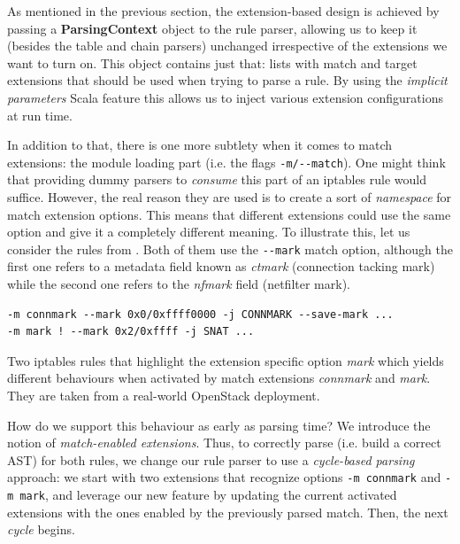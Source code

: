 As mentioned in the previous section, the extension-based design is achieved by
passing a \textbf{ParsingContext} object to the rule parser, allowing us to
keep it (besides the table and chain parsers) unchanged irrespective of the
extensions we want to turn on.  This object contains just that: lists with
match and target extensions that should be used when trying to parse a rule.
By using the \emph{implicit parameters} Scala feature this allows us to inject
various extension configurations at run time.

In addition to that, there is one more subtlety when it comes to match
extensions: the module loading part (i.e. the flags \lstinline{-m/--match}).
One might think that providing dummy parsers to \emph{consume} this part of an
iptables rule would suffice.  However, the real reason they are used is to
create a sort of \emph{namespace} for match extension options.  This means that
different extensions could use the same option and give it a completely
different meaning.  To illustrate this, let us consider the rules from
.  Both of them use the
\lstinline{--mark} match option, although the first one refers to a metadata
field known as \emph{ctmark} (connection tacking mark) while the second one
refers to the \emph{nfmark} field (netfilter mark).

\begin{listing}
  \lstset{numbers=none, frame=single, basicstyle=\ttfamily,
    xleftmargin=0.05\textwidth, xrightmargin=0.05\textwidth
  }
  \small
  \begin{lstlisting}
-m connmark --mark 0x0/0xffff0000 -j CONNMARK --save-mark ...
-m mark ! --mark 0x2/0xffff -j SNAT ...
  \end{lstlisting}
  \caption{Two iptables rules that highlight the extension specific option
  \emph{mark} which yields different behaviours when activated by match
  extensions \emph{connmark} and \emph{mark}.  They are taken from a real-world
  OpenStack deployment.}
  \label{lst:namespace-example}
\end{listing}

How do we support this behaviour as early as parsing time?  We introduce the
notion of \emph{match-enabled extensions}.  Thus, to correctly parse (i.e.
build a correct AST) for both rules, we change our rule parser to use a
\emph{cycle-based parsing} approach: we start with two extensions that
recognize options \lstinline{-m connmark} and \lstinline{-m mark}, and leverage
our new feature by updating the current activated extensions with the ones
enabled by the previously parsed match.  Then, the next \emph{cycle} begins.

